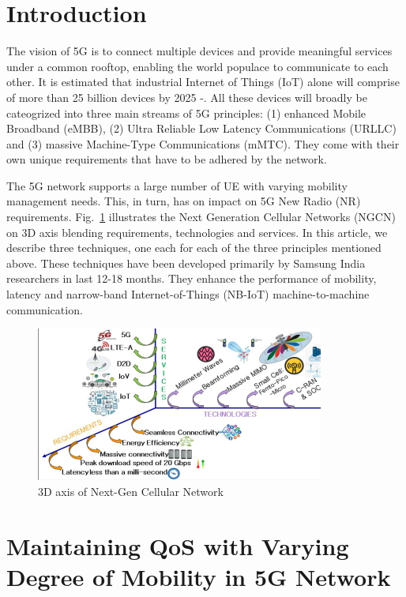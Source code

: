 \begin{multicols}{2}

\section{Introduction}
 
The vision of 5G is to connect multiple devices and provide meaningful services under a common rooftop, enabling the world populace to communicate to each other. It is estimated that industrial Internet of Things (IoT) alone will comprise of more than 25 billion devices by 2025 \cite{art1-key01}-\cite{art1-key02}. All these devices will broadly be cateogrized into three main streams of 5G principles: (1) enhanced Mobile Broadband (eMBB), (2) Ultra Reliable Low Latency Communications (URLLC) and (3) massive Machine-Type Communications (mMTC). They come with their own unique requirements that have to be adhered by the network.

The 5G network supports a large number of UE with varying mobility management needs. This, in turn, has on impact on 5G New Radio (NR) requirements. Fig.~\ref{chap1-fig01} illustrates the Next Generation Cellular Networks (NGCN) on 3D axis blending requirements, technologies and services. In this article, we describe three techniques, one each for each of the three principles mentioned above. These techniques have been developed primarily by Samsung India researchers in last 12-18 months. They enhance the performance of mobility, latency and narrow-band Internet-of-Things (NB-IoT) machine-to-machine communication. 

\setcounter{figure}{0}
\begin{figure}[H]
\centering
\includegraphics[scale=2.8]{src/Figures/chap1/chap1-fig01.jpg}
\caption{3D axis of Next-Gen Cellular Network}\label{chap1-fig01}
\end{figure}

\section{Maintaining QoS with Varying Degree of Mobility in 5G Network}


\end{multicols}
